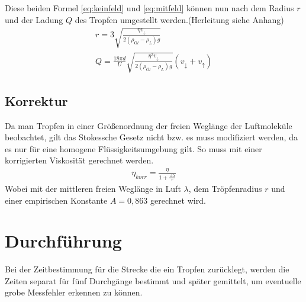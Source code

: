 Diese beiden Formel \ref{eq:keinfeld} und \ref{eq:mitfeld} können nun nach dem Radius $r$ und der Ladung $Q$ des Tropfen umgestellt werden.(Herleitung siehe Anhang)
\begin{gather}
r=3\sqrt{\frac{\eta v_{\downarrow}}{2(\rho_{Öl}-\rho_L)g}}\label{eq:radius}\\
Q = \frac{18 \pi d}{U}\sqrt{\frac{\eta^3 v_{\downarrow}}{2(\rho_{Öl}-\rho_L)g}}(v_{\downarrow}+v_{\uparrow})
\end{gather}
\subsection{Korrektur}
Da man Tropfen in einer Größenordnung der freien Weglänge der Luftmoleküle beobachtet, gilt das Stokessche Gesetz nicht bzw. es muss modifiziert werden, da es nur für eine homogene Flüssigkeitsumgebung gilt. So muss mit einer korrigierten Viskosität gerechnet werden.
\begin{align}
\eta_{korr}=\frac{\eta}{1+\frac{A\lambda}{r}}\label{eq:korrektur}
\end{align}
Wobei mit der mittleren freien Weglänge in Luft $\lambda$, dem Tröpfenradius $r$ und einer empirischen Konstante $A=0,863$ gerechnet wird.
\section{Durchführung}
Bei der Zeitbestimmung für die Strecke die ein Tropfen zurücklegt, werden die Zeiten separat für fünf Durchgänge bestimmt und später gemittelt, um eventuelle grobe Messfehler erkennen zu können. 
